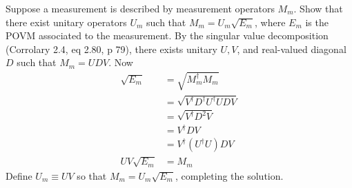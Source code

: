  Suppose a measurement is described by measurement operators $M_m$.  Show that there exist unitary operators $U_m$ such that $M_m=U_m\sqrt{E_m}$, where $E_m$ is the POVM associated to the measurement.
\Soln By the singular value decomposition (Corrolary 2.4, eq 2.80, p 79), there exists unitary $U, V$, and real-valued diagonal $D$  such that $M_m = UDV$.  Now
\begin{align*} \sqrt{E_m} &= \sqrt{M_m^\dagger M_m} \tag{definition}\\
                                          &= \sqrt{V^\dagger D^\dagger U^\dagger UDV} \tag{properties of $^\dagger$} \\
                                          &= \sqrt{V^\dagger D^2 V} \tag{$U$ unitary, $D$ real-valued diagonal} \\
                                          &= V^\dagger D V \tag{$V$ unitary$\rightarrow (V^\dagger DV)^2=V^\dagger D^2 V$} \\
                                          &= V^\dagger(U^\dagger U)DV \tag{$U$ unitary, $U^\dagger U=I$} \\
                    UV\sqrt{E_m}&= M_m \tag{$U,V$ unitary, solve for $M_m$}
\end{align*}
Define $U_m \equiv UV$ so that $M_m = U_m\sqrt{E_m}$, completing the solution.
\begin{comment}
\begin{align*}
    M_m^\dagger M_m &= \sqrt{E_m} U_m^\dagger U_m \sqrt{E_m}\\
        &= \sqrt{E_m} I \sqrt{E_m}\\
        &= E_m.
\end{align*}
Since $E_m$ is POVM,  for arbitrary  unitary $U$, $M_m^\dagger M_m$ is POVM.
\end{comment}


